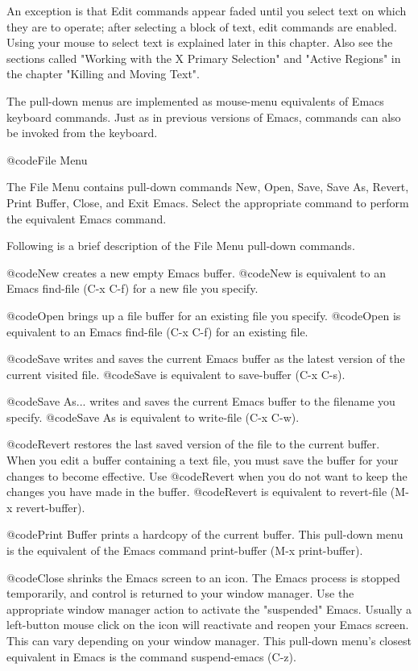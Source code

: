 {{An exception is that Edit commands appear faded until you select text on which
they are to operate; after selecting a block of text, edit commands are enabled. 
Using your mouse to select text is explained later in this chapter. 
Also see the sections called "Working with the X Primary Selection" and "Active
Regions" in the chapter "Killing and Moving Text".

The pull-down menus are implemented as mouse-menu
equivalents of Emacs keyboard commands.  
Just as in previous versions of Emacs,
commands can also be invoked from the keyboard.   

@code{File Menu}

The File Menu contains pull-down commands New, Open, Save, 
Save As, Revert,
Print Buffer, Close, and Exit Emacs.  
Select the appropriate command to perform the 
equivalent Emacs command.  

Following is a brief description of the File Menu pull-down commands. 

@code{New} creates a
new empty Emacs buffer.  @code{New} is equivalent to an Emacs find-file (C-x C-f) for
a new file you specify.  

@code{Open} brings up a file buffer for an existing file 
you specify.  @code{Open} is equivalent to an Emacs find-file (C-x C-f) for
an existing file. 

@code{Save} writes and saves the current Emacs buffer as the latest version of the
current visited file.  @code{Save} is equivalent to save-buffer (C-x C-s).

@code{Save As...} writes and saves the current Emacs buffer to the filename you 
specify. @code{Save As} is equivalent to write-file (C-x C-w).

@code{Revert} restores the last saved version of the file to the current buffer.  
When you edit a buffer containing a text file, you must save the buffer
for your changes to become effective.  
Use @code{Revert} when you do not want to keep the changes you have made in the buffer.  
@code{Revert} is 
equivalent to revert-file (M-x revert-buffer).

@code{Print Buffer} prints a hardcopy of the current buffer.  This pull-down menu 
is the equivalent of the Emacs command print-buffer (M-x print-buffer).  

@code{Close} shrinks the Emacs screen to an icon.  The Emacs process is 
stopped temporarily, and control is returned to your window manager.  Use
the appropriate window manager action to activate the "suspended" Emacs. 
Usually a left-button mouse click on the icon will reactivate and reopen your Emacs screen.   
This can vary depending on your window manager. 
This pull-down menu's closest equivalent in Emacs is the command suspend-emacs (C-z).

}}
